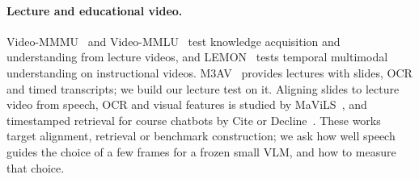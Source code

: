 \paragraph{Lecture and educational video.}
Video-MMMU~\cite{hu2025videommmu} and Video-MMLU~\cite{song2025videommlu} test knowledge acquisition and understanding from lecture videos, and LEMON~\cite{yu2026lemon} tests temporal multimodal understanding on instructional videos.
M3AV~\cite{chen2024m3av} provides lectures with slides, OCR and timed transcripts; we build our lecture test on it.
Aligning slides to lecture video from speech, OCR and visual features is studied by MaViLS~\cite{anderer2024mavils}, and timestamped retrieval for course chatbots by Cite or Decline~\cite{ahmed2026cite}.
These works target alignment, retrieval or benchmark construction; we ask how well speech guides the choice of a few frames for a frozen small VLM, and how to measure that choice.

